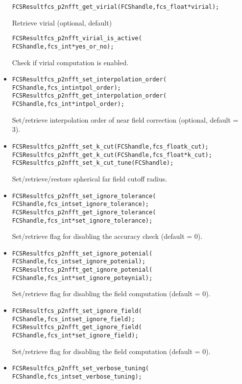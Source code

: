 \begin{itemize}
\begin{alltt}
FCSResult fcs_p2nfft_get_virial(FCS handle, fcs_float* virial);
\end{alltt}
    Retrieve virial (optional, default)
\begin{alltt}
FCSResult fcs_p2nfft_virial_is_active(
    FCS handle, fcs_int* yes_or_no);
\end{alltt}
    Check if virial computation is enabled.
  \item
\begin{alltt}
FCSResult fcs_p2nfft_set_interpolation_order(
    FCS handle, fcs_int intpol_order);
FCSResult fcs_p2nfft_get_interpolation_order(
    FCS handle, fcs_int* intpol_order);
\end{alltt}
    Set/retrieve interpolation order of near field correction (optional, default = 3).
  \item
\begin{alltt}
FCSResult fcs_p2nfft_set_k_cut(FCS handle, fcs_float k_cut);
FCSResult fcs_p2nfft_get_k_cut(FCS handle, fcs_float* k_cut);
FCSResult fcs_p2nfft_set_k_cut_tune(FCS handle);
\end{alltt}
    Set/retrieve/restore spherical far field cutoff radius.
  \item
\begin{alltt}
FCSResult fcs_p2nfft_set_ignore_tolerance(
    FCS handle, fcs_int set_ignore_tolerance);
FCSResult fcs_p2nfft_get_ignore_tolerance(
    FCS handle, fcs_int* set_ignore_tolerance);
\end{alltt}
    Set/retrieve flag for disabling the accuracy check (default = 0).
  \item
\begin{alltt}
FCSResult fcs_p2nfft_set_ignore_potenial(
    FCS handle, fcs_int set_ignore_potenial);
FCSResult fcs_p2nfft_get_ignore_potenial(
    FCS handle, fcs_int* set_ignore_poteynial);
\end{alltt}
    Set/retrieve flag for disabling the field computation (default = 0).
  \item
\begin{alltt}
FCSResult fcs_p2nfft_set_ignore_field(
    FCS handle, fcs_int set_ignore_field);
FCSResult fcs_p2nfft_get_ignore_field(
    FCS handle, fcs_int* set_ignore_field);
\end{alltt}
    Set/retrieve flag for disabling the field computation (default = 0).
  \item
\begin{alltt}
FCSResult fcs_p2nfft_set_verbose_tuning(
    FCS handle, fcs_int set_verbose_tuning);

\end{alltt}
\end{itemize}
